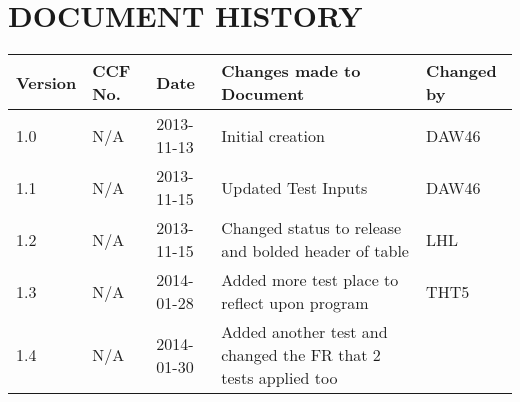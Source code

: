 \documentclass{project}
\begin{document}
\section*{DOCUMENT HISTORY}
\begin{flushleft}
\begin{tabular}{ | p{1.5cm} | p{1cm} | p{2cm} | p{6cm}| p{1.5cm}| }
\hline
Version & CCF No. & Date & Changes made to Document & Changed by \\
\hline

1.0 & N/A & 2013-11-13 & Initial creation & DAW46 \\ \hline
1.1 & N/A & 2013-11-15 & Updated Test Inputs & DAW46 \\ \hline
1.2 & N/A & 2013-11-15 & Changed status to release and bolded header of table & LHL \\ \hline
1.3 & N/A & 2014-01-28 & Added more test place to reflect upon program & THT5 \\ \hline
1.4 & N/A & 2014-01-30 & Added another test and changed the FR that 2 tests applied too \\ \hline
\end{tabular}
\end{flushleft}
\label{thelastpage}
\end{document}
